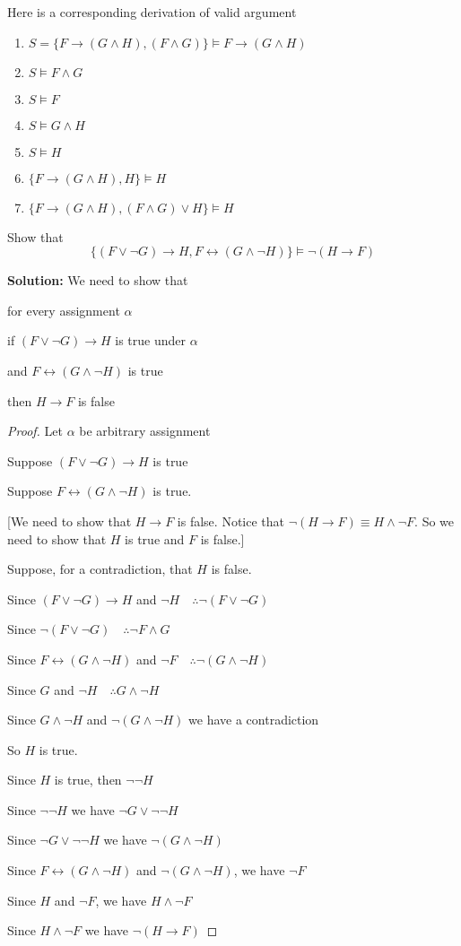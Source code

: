 Here is a corresponding derivation of valid argument

\begin{enumerate}
    \item $S = \{F\to (G\wedge H),(F\wedge G)\} \vDash F \to (G\wedge H)$
    \item $S \vDash F\wedge G$
    \item $S\vDash F$
    \item $S\vDash G\wedge H$
    \item $S\vDash H$
    \item $\{F\to (G\wedge H),H\} \vDash H$
    \item $\{F\to (G\wedge H),(F\wedge G)\vee H\} \vDash H$
\end{enumerate}


\begin{exmp}
Show that 
\[
\{(F\vee \neg G) \to H, F\leftrightarrow (G\wedge \neg H)\}\vDash \neg (H\to F)
\]
\end{exmp}

\textbf{Solution: }We need to show that 

for every assignment $\alpha$

if $(F\vee \neg G) \to H$ is true under $\alpha$

and $F\leftrightarrow (G\wedge \neg H)$ is true

then $H\to F$ is false 

\begin{proof}
Let $\alpha$ be arbitrary assignment

Suppose $(F\vee \neg G) \to H$ is true

Suppose $F\leftrightarrow (G\wedge \neg H)$ is true.

[We need to show that $H\to F$ is false. Notice that $\neg (H\to F) \equiv H \wedge \neg F$. So we need to show that $H$ is true and $F$ is false.]

Suppose, for a contradiction, that $H$ is false.

Since $(F\vee \neg G) \to H$ and $\neg H \quad \therefore \neg(F\vee \neg G)$

Since $\neg (F\vee \neg G)\quad \therefore \neg F \wedge G$

Since $F\leftrightarrow (G\wedge \neg H)$ and $\neg F \quad \therefore \neg(G\wedge \neg H)$

Since $G$ and  $\neg H \quad \therefore G\wedge \neg H$

Since $G\wedge \neg H$ and $\neg (G\wedge \neg H)$ we have a contradiction

So $H$ is true.

Since $H$ is true, then $\neg \neg H$

Since $\neg \neg H$ we have $\neg G \vee \neg \neg H$

Since $\neg G \vee \neg \neg H$ we have $\neg (G\wedge \neg H)$

Since $F\leftrightarrow (G\wedge \neg H)$ and $\neg (G\wedge \neg H)$, we have $\neg F$

Since $H$ and $\neg F$, we have $H\wedge \neg F$

Since $H\wedge \neg F$ we have $\neg (H\to F)$


\end{proof}



